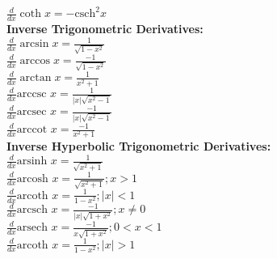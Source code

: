 \documentclass[12pt]{article}
\begin{document}
    \\ \( \displaystyle\frac{ d }{ dx } \coth x = - \text{csch}^2 x \)
\\ \textbf{Inverse Trigonometric Derivatives:}
    \\ \( \displaystyle\frac{ d }{ dx } \arcsin x = \displaystyle\frac{ 1 }{ \sqrt{ 1 - x^2 } } \)
    \\ \( \displaystyle\frac{ d }{ dx } \arccos x = \displaystyle\frac{ -1 }{ \sqrt{ 1 - x^2 } } \)
    \\ \( \displaystyle\frac{ d }{ dx } \arctan x = \displaystyle\frac{ 1 }{ x^2 + 1 } \)
    \\ \( \displaystyle\frac{ d }{ dx } \text{arccsc } x = \displaystyle\frac{ 1 }{ | x | \sqrt{ x^2 - 1 } } \)
    \\ \( \displaystyle\frac{ d }{ dx } \text{arcsec } x = \displaystyle\frac{ -1 }{ | x | \sqrt{ x^2 - 1 } } \)
    \\ \( \displaystyle\frac{ d }{ dx } \text{arccot } x = \displaystyle\frac{ -1 }{ x^2 + 1 } \)
\\ \textbf{Inverse Hyperbolic Trigonometric Derivatives:}
    \\ \( \displaystyle\frac{ d }{ dx } \text{arsinh } x = \displaystyle\frac{ 1 }{ \sqrt{ x^2 + 1 } } \)
    \\ \( \displaystyle\frac{ d }{ dx } \text{arcosh } x = \displaystyle\frac{ 1 }{ \sqrt{ x^2 + 1 } } ; x > 1 \)
    \\ \( \displaystyle\frac{ d }{ dx } \text{arcoth } x = \displaystyle\frac{ 1 }{ 1 - x^2 } ; | x | < 1 \)
    \\ \( \displaystyle\frac{ d }{ dx } \text{arcsch } x = \displaystyle\frac{ -1 }{ | x | \sqrt{ 1 + x^2 } } ; x \neq 0 \)
    \\ \( \displaystyle\frac{ d }{ dx } \text{arsech } x = \displaystyle\frac{ -1 }{ x \sqrt{ 1 + x^2 } } ; 0 < x < 1 \)
    \\ \( \displaystyle\frac{ d }{ dx } \text{arcoth } x = \displaystyle\frac{ 1 }{ 1 - x^2 } ; | x | > 1 \)
    
\end{document}
